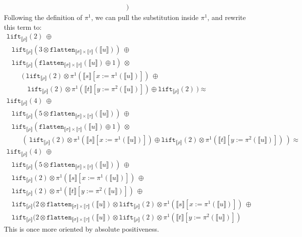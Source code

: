 \documentclass[runningheads,a4paper]{llncs}
\newcommand{\typeinterpret}[1]{\llbracket #1 \rrbracket}
\newcommand{\interpret}[1]{\llbracket #1 \rrbracket}
\newcommand{\flatten}{\mathtt{flatten}}
\newcommand{\lift}{\mathtt{lift}}
\begin{document}
\begin{itemize}
\[\begin{array}{l}
    \ )
  \end{array}
  \]
  Following the definition of $\pi^1$, we can pull the substitution
  inside $\pi^1$, and rewrite this term to:
  \[
  \begin{array}{l}
  \lift_{\typeinterpret{\rho}}(2)\ \oplus \\
  \phantom{A}
    \lift_{\typeinterpret{\rho}}(3 \otimes
    \flatten_{\typeinterpret{\sigma} \times \typeinterpret{\tau}}(
    \interpret{u}))\ \oplus \\
  \phantom{A}
    \lift_{\typeinterpret{\rho}}(
    \flatten_{\typeinterpret{\sigma} \times \typeinterpret{\tau}}(
    \interpret{u}) \oplus 1)\ \otimes \\
  \phantom{ABC}
    (\ \lift_{\typeinterpret{\rho}}(2) \otimes \pi^1(\interpret{s}[
    x:=\pi^1(\interpret{u})])\ \oplus \\
  \phantom{ABCD}
    \lift_{\typeinterpret{\rho}}(2) \otimes \pi^1(\interpret{t}[
    y:=\pi^2(\interpret{u})]) \oplus \lift_{\typeinterpret{\rho}}(2)
    \ ) \approx \\
  \lift_{\typeinterpret{\rho}}(4)\ \oplus \\
  \phantom{A}
    \lift_{\typeinterpret{\rho}}(5 \otimes
    \flatten_{\typeinterpret{\sigma} \times \typeinterpret{\tau}}(
    \interpret{u}))\ \oplus \\
  \phantom{A}
    \lift_{\typeinterpret{\rho}}(
    \flatten_{\typeinterpret{\sigma} \times \typeinterpret{\tau}}(
    \interpret{u}) \oplus 1)\ \otimes \\
  \phantom{ABC}
    (\ \lift_{\typeinterpret{\rho}}(2) \otimes \pi^1(\interpret{s}[
    x:=\pi^1(\interpret{u})]) \oplus
    \lift_{\typeinterpret{\rho}}(2) \otimes \pi^1(\interpret{t}[
    y:=\pi^2(\interpret{u})])
    \ ) \approx \\
  \lift_{\typeinterpret{\rho}}(4)\ \oplus \\
  \phantom{A}
    \lift_{\typeinterpret{\rho}}(5 \otimes
    \flatten_{\typeinterpret{\sigma} \times \typeinterpret{\tau}}(
    \interpret{u}))\ \oplus \\
  \phantom{A}
    \lift_{\typeinterpret{\rho}}(2) \otimes \pi^1(\interpret{s}[
    x:=\pi^1(\interpret{u})])\ \oplus \\
  \phantom{A}
    \lift_{\typeinterpret{\rho}}(2) \otimes \pi^1(\interpret{t}[
    y:=\pi^2(\interpret{u})])\ \oplus \\
  \phantom{A}
    \lift_{\typeinterpret{\rho}}(2 \otimes
    \flatten_{\typeinterpret{\sigma} \times \typeinterpret{\tau}}(
    \interpret{u}) \otimes
    \lift_{\typeinterpret{\rho}}(2) \otimes \pi^1(\interpret{s}[
    x:=\pi^1(\interpret{u})])\ \oplus \\
  \phantom{A}
    \lift_{\typeinterpret{\rho}}(2 \otimes
    \flatten_{\typeinterpret{\sigma} \times \typeinterpret{\tau}}(
    \interpret{u}) \otimes
    \lift_{\typeinterpret{\rho}}(2) \otimes \pi^1(\interpret{t}[
    y:=\pi^2(\interpret{u})])
  \end{array}
  \]
  This is once more oriented by absolute positiveness.


\end{itemize}
\end{document}
